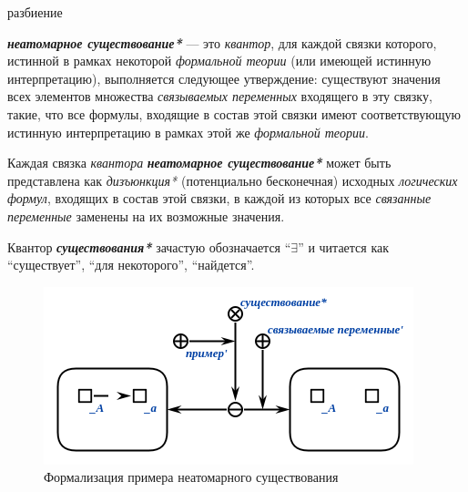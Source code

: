 \begin{SCn}
\begin{scnrelfromset}{разбиение}
\end{scnrelfromset}

\end{SCn}

\textbf{\textit{неатомарное существование*}} --- это \textit{квантор}, для каждой связки которого, истинной в рамках некоторой \textit{формальной теории} (или имеющей истинную интерпретацию), выполняется следующее утверждение: существуют значения всех элементов множества \textit{связываемых переменных\scnrolesign} входящего в эту связку, такие, что все формулы, входящие в состав этой связки имеют соответствующую истинную интерпретацию в рамках этой же \textit{формальной теории}.

Каждая связка \textit{квантора} \textbf{\textit{неатомарное существование*}} может быть представлена как \textit{дизъюнкция*} (потенциально бесконечная) исходных \textit{логических формул}, входящих в состав этой связки, в каждой из которых все \textit{связанные переменные\scnrolesign} заменены на их возможные значения.

Квантор \textbf{\textit{существования*}} зачастую обозначается ``$\exists$'' и читается как ``существует'', ``для некоторого'', ``найдется''.

\begin{figure}[H]
\includegraphics[scale=0.8]{author/part2/figures/logic/non_atomicExistence.png}
\caption{Формализация примера неатомарного существования}
\label{fig:non_atomic_existence}
\end{figure}

\begin{SCn}
\end{SCn}

